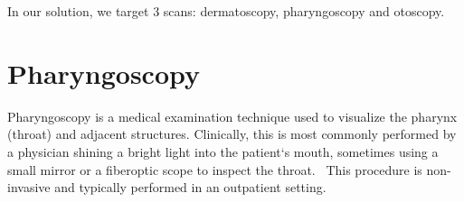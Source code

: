 In our solution, we target 3 scans: dermatoscopy, pharyngoscopy and otoscopy.

\section{Pharyngoscopy}

Pharyngoscopy is a medical examination technique used to visualize the pharynx (throat) and adjacent structures. Clinically, this is most commonly performed by a physician shining a bright light into the patient`s mouth, sometimes using a small mirror or a fiberoptic scope to inspect the throat.~\cite{onto} This procedure is non-invasive and typically performed in an outpatient setting. \par